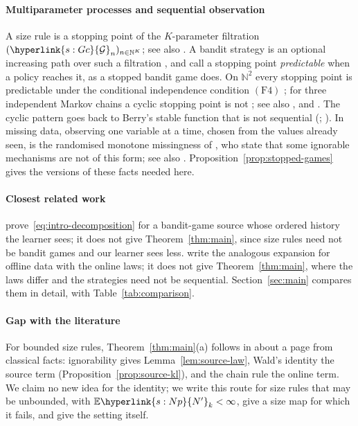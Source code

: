 \documentclass[11pt]{article}
\newcommand{\sy}[2]{\hyperlink{#1}{#2}}
\newcommand{\E}{\mathbb{E}}
\newcommand{\N}{\mathbb{N}}
\newcommand{\Gc}{\sy{s:Gc}{\mathcal{G}}}
\newcommand{\Np}{\sy{s:Np}{N'}}
\begin{document}
\paragraph{Multiparameter processes and sequential observation} A size rule is a stopping point of
the $K$-parameter filtration $(\Gc_n)_{n\in\N^K}$; see also \citet{CW75}. A bandit strategy is an
optional increasing path over such a filtration \citep{M86,KM98}, and \citet[Section~1.3]{MV81}
call a stopping point \emph{predictable} when a policy reaches it, as a stopped bandit game does.
On $\N^2$ every stopping point is predictable under the conditional independence condition
$(\mathrm{F}4)$ \citep[Theorem~4]{MV81}; for three independent Markov chains a cyclic stopping point
is not \citep[Section~5.2]{MV81}; see also \citet{KS81}, \citet[Proposition~3]{M83} and \citet{W81}.
The cyclic pattern goes back to Berry's stable function that is not sequential
(\citealp[Proposition~II.2.2]{Ber76}; \citealp{Cur03}). In missing data, observing one variable at a time, chosen
from the values already seen, is the randomised monotone missingness of \citet{RG97}, who state
that some ignorable mechanisms are not of this form; see also \citet{GR97}.
Proposition~\ref{prop:stopped-games} gives the versions of these facts needed here.

\paragraph{Closest related work} \citet[Lemma~22]{PMRM26} prove~\eqref{eq:intro-decomposition} for
a bandit-game source whose ordered history the learner sees; it does not give
Theorem~\ref{thm:main}, since size rules need not be bandit games and our learner sees less.
\citet[(10)]{AJSS23} write the analogous expansion for offline data with the online laws; it does
not give Theorem~\ref{thm:main}, where the laws differ and the strategies need not be sequential.
Section~\ref{sec:main} compares them in detail, with Table~\ref{tab:comparison}.

\paragraph{Gap with the literature} For bounded size rules, Theorem~\ref{thm:main}(a) follows in
about a page from classical facts: ignorability gives Lemma~\ref{lem:source-law}, Wald's identity
the source term (Proposition~\ref{prop:source-kl}), and the chain rule the online term. We claim no
new idea for the identity; we write this route for size rules that may be unbounded, with
$\E \Np_k<\infty$, give a size map for which it fails, and give the setting itself.
\end{document}
